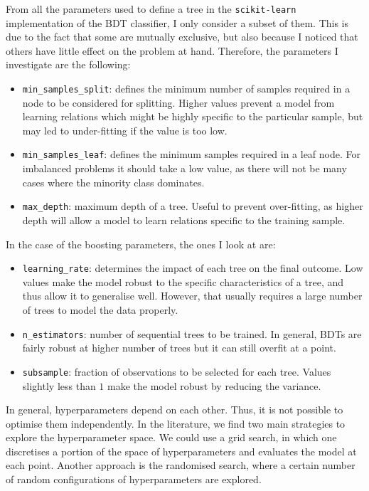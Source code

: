 From all the parameters used to define a tree in the \texttt{scikit-learn} implementation of the BDT classifier, I only consider a subset of them. This is due to the fact that some are mutually exclusive, but also because I noticed that others have little effect on the problem at hand. Therefore, the parameters I investigate are the following:
\begin{itemize}
	\item \texttt{min_samples_split}: defines the minimum number of samples required in a node to be considered for splitting. Higher values prevent a model from learning relations which might be highly specific to the particular sample, but may led to under-fitting if the value is too low.
	\item \texttt{min_samples_leaf}: defines the minimum samples required in a leaf node. For imbalanced problems it should take a low value, as there will not be many cases where the minority class dominates.
	\item \texttt{max_depth}: maximum depth of a tree. Useful to prevent over-fitting, as higher depth will allow a model to learn relations specific to the training sample.
\end{itemize}
In the case of the boosting parameters, the ones I look at are:
\begin{itemize}
	\item \texttt{learning_rate}: determines the impact of each tree on the final outcome. Low values make the model robust to the specific characteristics of a tree, and thus allow it to generalise well. However, that usually requires a large number of trees to model the data properly.
	\item \texttt{n_estimators}: number of sequential trees to be trained. In general, BDTs are fairly robust at higher number of trees but it can still overfit at a point.
	\item \texttt{subsample}: fraction of observations to be selected for each tree. Values slightly less than $1$ make the model robust by reducing the variance.
\end{itemize}

In general, hyperparameters depend on each other. Thus, it is not possible to optimise them independently. In the literature, we find two main strategies to explore the hyperparameter space. We could use a grid search, in which one discretises a portion of the space of hyperparameters and evaluates the model at each point. Another approach is the randomised search, where a certain number of random configurations of hyperparameters are explored.

